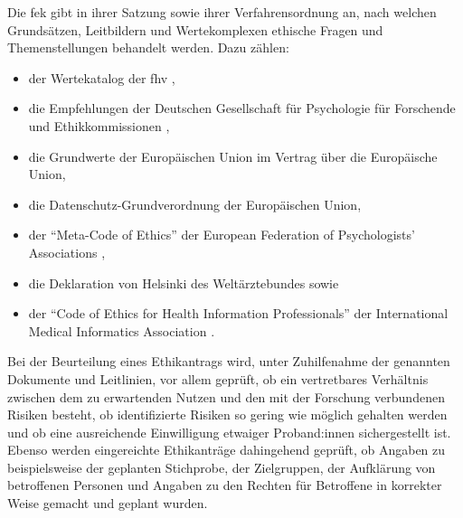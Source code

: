 \documentclass[a4paper,12pt,twoside,numbers=noendperiod]{scrreprt}
\begin{document}
Die \ac{fek} gibt in ihrer Satzung \cite[1]{forschungsethik-kommission_der_fachhochschule_vorarlberg_satzung_2021} sowie ihrer Verfahrensordnung \cite[1\psq]{forschungsethik-kommission_der_fachhochschule_vorarlberg_verfahrensordnung_2020} an, nach welchen Grundsätzen, Leitbildern und Wertekomplexen ethische Fragen und Themenstellungen behandelt werden. Dazu zählen:
\begin{itemize}
    \item der Wertekatalog der \acl{fhv} \cite{kollegium_der_fachhochschule_vorarlberg_gmbh_wertekatalog_2022},
    \item die Empfehlungen der Deutschen Gesellschaft für Psychologie für Forschende und Ethikkommissionen \cite{deutsche_gesellschaft_fur_psychologie_ev_ethisches_2018},
    \item die Grundwerte der Europäischen Union im Vertrag über die Europäische Union,
    \item die Datenschutz-Grundverordnung der Europäischen Union,
    \item der \enquote{Meta-Code of Ethics} der European Federation of Psychologists' Associations \cite{european_federation_of_psychologists_associations_meta-code_2005},
    \item die Deklaration von Helsinki des Weltärztebundes \cite{world_medical_association_world_2013} sowie
    \item der \enquote{Code of Ethics for Health Information Professionals} der International Medical Informatics Association \cite{international_medical_informatics_association_imia_2016}.
\end{itemize}

Bei der Beurteilung eines Ethikantrags wird, unter Zuhilfenahme der genannten Dokumente und Leitlinien, vor allem geprüft, ob ein vertretbares Verhältnis zwischen dem zu erwartenden Nutzen und den mit der Forschung verbundenen Risiken besteht, ob identifizierte Risiken so gering wie möglich gehalten werden und ob eine ausreichende Einwilligung etwaiger Proband:innen sichergestellt ist. Ebenso werden eingereichte Ethikanträge dahingehend geprüft, ob Angaben zu beispielsweise der geplanten Stichprobe, der Zielgruppen, der Aufklärung von betroffenen Personen und Angaben zu den Rechten für Betroffene in korrekter Weise gemacht und geplant wurden. \cite[1\psq]{forschungsethik-kommission_der_fachhochschule_vorarlberg_verfahrensordnung_2020}
\end{document}
